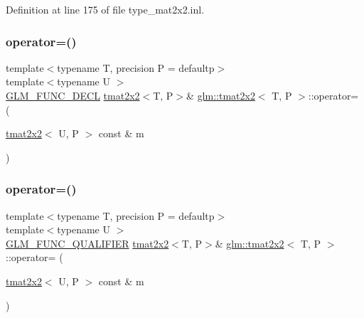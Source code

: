 Definition at line 175 of file type\+\_\+mat2x2.\+inl.

\mbox{\label{structglm_1_1tmat2x2_a825289bb785c04c724709112352b9dc6}} 
\subsubsection{\texorpdfstring{operator=()}{operator=()}\hspace{0.1cm}{\footnotesize\ttfamily [2/3]}}
{\footnotesize\ttfamily template$<$typename T, precision P = defaultp$>$ \\
template$<$typename U $>$ \\
\mbox{\hyperlink{setup_8hpp_ab2d052de21a70539923e9bcbf6e83a51}{G\+L\+M\+\_\+\+F\+U\+N\+C\+\_\+\+D\+E\+CL}} \mbox{\hyperlink{structglm_1_1tmat2x2}{tmat2x2}}$<$T, P$>$\& \mbox{\hyperlink{structglm_1_1tmat2x2}{glm\+::tmat2x2}}$<$ T, P $>$\+::operator= (\begin{DoxyParamCaption}\item[{\mbox{\hyperlink{structglm_1_1tmat2x2}{tmat2x2}}$<$ U, P $>$ const \&}]{m }\end{DoxyParamCaption})}

\mbox{\label{structglm_1_1tmat2x2_a44d29639987fd39514ae079271487363}} 
\subsubsection{\texorpdfstring{operator=()}{operator=()}\hspace{0.1cm}{\footnotesize\ttfamily [3/3]}}
{\footnotesize\ttfamily template$<$typename T, precision P = defaultp$>$ \\
template$<$typename U $>$ \\
\mbox{\hyperlink{setup_8hpp_a33fdea6f91c5f834105f7415e2a64407}{G\+L\+M\+\_\+\+F\+U\+N\+C\+\_\+\+Q\+U\+A\+L\+I\+F\+I\+ER}} \mbox{\hyperlink{structglm_1_1tmat2x2}{tmat2x2}}$<$T, P$>$\& \mbox{\hyperlink{structglm_1_1tmat2x2}{glm\+::tmat2x2}}$<$ T, P $>$\+::operator= (\begin{DoxyParamCaption}\item[{\mbox{\hyperlink{structglm_1_1tmat2x2}{tmat2x2}}$<$ U, P $>$ const \&}]{m }\end{DoxyParamCaption})}



